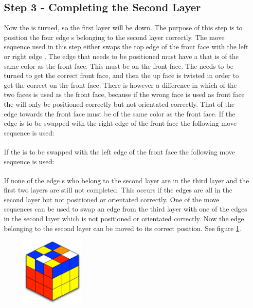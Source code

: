 \subsection{Step 3 - Completing the Second Layer}\label{sub:step3}
Now the \cube{} is turned, so the first layer will be down. 
The purpose of this step is to position the four edge \cpiece{}s belonging to the second layer correctly. 
The move sequence used in this step either swaps the top edge \cpiece{} of the front face with the left or right edge \cpiece{}. 
The edge \cpiece{} that needs to be positioned must have a \facelet{} that is of the same color as the front face. This \facelet{} must be on the front face. 
The \cube{} needs to be turned to get the correct front face, and then the up face is twisted in order to get the correct \cpiece{} on the front face. 
There is however a difference in which of the two faces is used as the front face, because if the wrong face is used as front face the \cpiece{} will only be positioned correctly but not orientated correctly. 
That \facelet{} of the edge towards the front face must be of the same color as the front face. 
If the edge \cpiece{} is to be swapped with the right edge \cpiece{} of the front face the following move sequence is used: \\

 \\

If the \cpiece{} is to be swapped with the left edge \cpiece{} of the front face the following move sequence is used: \\

 \\

If none of the edge \cpiece{}s who belong to the second layer are in the third layer and the first two layers are still not completed. 
This occurs if the edges are all in the second layer but not positioned or orientated correctly. 
One of the move sequences can be used to swap an edge \cpiece{} from the third layer with one of the edges in the second layer which is not positioned or orientated correctly.
Now the edge \cpiece{} belonging to the second layer can be moved to its correct position. See figure \ref{fig:3F2L}.

\begin{figure}
\begin{center}
	\includegraphics[width=0.28\textwidth]{input/pics/3F2L.pdf}	
\end{center}
\caption{}
\label{fig:3F2L}
\end{figure}




